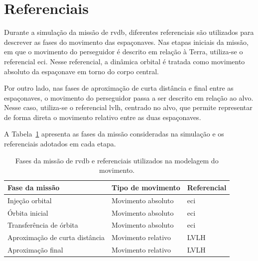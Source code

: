 \section{Referenciais}

Durante a simulação da missão de \gls{rvdb}, diferentes referenciais são utilizados para descrever as fases do movimento das espaçonaves. 
Nas etapas iniciais da missão, em que o movimento do perseguidor é descrito em relação à Terra, utiliza-se o referencial \gls{eci}. 
Nesse referencial, a dinâmica orbital é tratada como movimento absoluto da espaçonave em torno do corpo central.

Por outro lado, nas fases de aproximação de curta distância e final entre as espaçonaves, o movimento do perseguidor passa a ser descrito em relação ao alvo. 
Nesse caso, utiliza-se o referencial \gls{lvlh}, centrado no alvo, que permite representar de forma direta o movimento relativo entre as duas espaçonaves.

A Tabela~\ref{tab_fases_missao_referenciais} apresenta as fases da missão consideradas na simulação e os referenciais adotados em cada etapa.

\begin{table}[H]
\centering
\caption{Fases da missão de \gls{rvdb} e referenciais utilizados na modelagem do movimento.}
\label{tab_fases_missao_referenciais}
\begin{tabular}{lll}
\hline
\textbf{Fase da missão} & \textbf{Tipo de movimento} & \textbf{Referencial} \\
\hline
Injeção orbital                & Movimento absoluto & \gls{eci} \\
Órbita inicial                 & Movimento absoluto & \gls{eci} \\
Transferência de órbita        & Movimento absoluto & \gls{eci} \\
Aproximação de curta distância & Movimento relativo & LVLH \\
Aproximação final              & Movimento relativo & LVLH \\
\hline
\end{tabular}
\end{table}